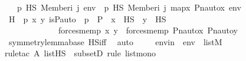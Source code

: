 \begin{isabellebody}
\ \ \ {\isachardoublequoteopen}p\ {\isasymtturnstile}HS\ Member{\isacharparenleft}{\kern0pt}i{\isacharcomma}{\kern0pt}\ j{\isacharparenright}{\kern0pt}\ env\ {\isasymlongleftrightarrow}\ {\isasympi}{\isacharbackquote}{\kern0pt}p\ {\isasymtturnstile}HS\ Member{\isacharparenleft}{\kern0pt}i{\isacharcomma}{\kern0pt}\ j{\isacharparenright}{\kern0pt}\ map{\isacharparenleft}{\kern0pt}{\isasymlambda}x{\isachardot}{\kern0pt}\ Pn{\isacharunderscore}{\kern0pt}auto{\isacharparenleft}{\kern0pt}{\isasympi}{\isacharparenright}{\kern0pt}{\isacharbackquote}{\kern0pt}x{\isacharcomma}{\kern0pt}\ env{\isacharparenright}{\kern0pt}{\isachardoublequoteclose}\ \isanewline
%
\isadelimproof
%
\endisadelimproof
%
\isatagproof
{}\isamarkupfalse%
\ {\isacharminus}{\kern0pt}\ \isanewline
\ \ \isamarkupfalse%
\ H{\isacharcolon}{\kern0pt}\ {\isachardoublequoteopen}{\isasymAnd}{\isasympi}\ p\ x\ y{\isachardot}{\kern0pt}\ is{\isacharunderscore}{\kern0pt}P{\isacharunderscore}{\kern0pt}auto{\isacharparenleft}{\kern0pt}{\isasympi}{\isacharparenright}{\kern0pt}\ {\isasymLongrightarrow}\ p\ {\isasymin}\ P\ {\isasymLongrightarrow}\ x\ {\isasymin}\ HS\ {\isasymLongrightarrow}\ y\ {\isasymin}\ HS\ \isanewline
\ \ \ \ \ \ \ \ \ \ \ \ {\isasymLongrightarrow}\ {\isacharparenleft}{\kern0pt}forces{\isacharunderscore}{\kern0pt}mem{\isacharparenleft}{\kern0pt}p{\isacharcomma}{\kern0pt}\ x{\isacharcomma}{\kern0pt}\ y{\isacharparenright}{\kern0pt}\ {\isasymlongleftrightarrow}\ forces{\isacharunderscore}{\kern0pt}mem{\isacharparenleft}{\kern0pt}{\isasympi}{\isacharbackquote}{\kern0pt}p{\isacharcomma}{\kern0pt}\ Pn{\isacharunderscore}{\kern0pt}auto{\isacharparenleft}{\kern0pt}{\isasympi}{\isacharparenright}{\kern0pt}{\isacharbackquote}{\kern0pt}x{\isacharcomma}{\kern0pt}\ Pn{\isacharunderscore}{\kern0pt}auto{\isacharparenleft}{\kern0pt}{\isasympi}{\isacharparenright}{\kern0pt}{\isacharbackquote}{\kern0pt}y{\isacharparenright}{\kern0pt}{\isacharparenright}{\kern0pt}{\isachardoublequoteclose}\ \isanewline
\ \ \ \ \isamarkupfalse%
\ symmetry{\isacharunderscore}{\kern0pt}lemma{\isacharunderscore}{\kern0pt}base\ HS{\isacharunderscore}{\kern0pt}iff\ \isamarkupfalse%
\ auto\ \isanewline
\isanewline
\ \ \isamarkupfalse%
\ envin\ {\isacharcolon}{\kern0pt}\ {\isachardoublequoteopen}env\ {\isasymin}\ list{\isacharparenleft}{\kern0pt}M{\isacharparenright}{\kern0pt}{\isachardoublequoteclose}\ \isanewline
\ \ \ \ \isamarkupfalse%
{\isacharparenleft}{\kern0pt}rule{\isacharunderscore}{\kern0pt}tac\ A{\isacharequal}{\kern0pt}\ {\isachardoublequoteopen}list{\isacharparenleft}{\kern0pt}HS{\isacharparenright}{\kern0pt}{\isachardoublequoteclose}\ \ subsetD{\isacharcomma}{\kern0pt}\ rule\ list{\isacharunderscore}{\kern0pt}mono{\isacharparenright}{\kern0pt}\isanewline

\end{isabellebody}
